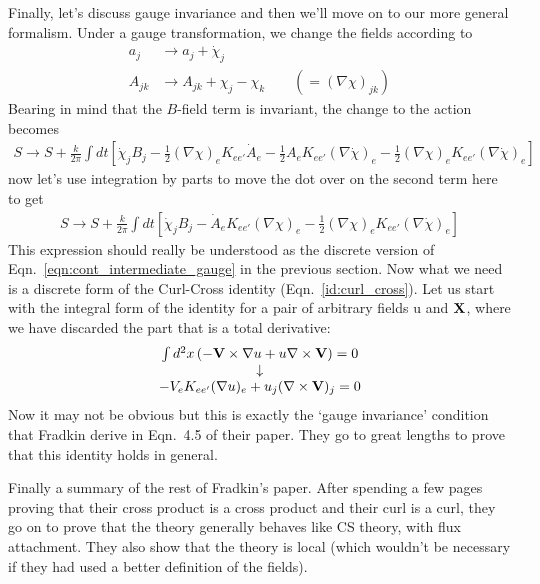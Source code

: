 \documentclass[11pt, oneside]{article} %
\numberwithin{equation}{section}
\begin{document}
Finally, let's discuss gauge invariance and then we'll move on to our more general formalism. Under a gauge transformation, we change the fields according to
\begin{align}
    a_j &\rightarrow a_j + \dot \chi_j\\
    A_{jk} &\rightarrow A_{jk} + \chi_j - \chi_k \qquad (=(\nabla \chi)_{jk})
\end{align}
Bearing in mind that the $B$-field term is invariant, the change to the action becomes
\begin{align}
    S \rightarrow S + \frac k{2\pi} \int dt
    \left [ 
        \dot \chi_j B_j 
        - \frac 12 (\nabla \chi)_e K_{ee'} \dot A_e
        - \frac 12 A_e K_{ee'} (\nabla \dot \chi)_e 
        - \frac 12 (\nabla \chi)_e K_{ee'} (\nabla \dot \chi)_e 
    \right ]
\end{align}
now let's use integration by parts to move the dot over on the second term here to get
\begin{align}
    S \rightarrow S + \frac k{2\pi} \int dt
    \left [ 
        \dot \chi_j B_j 
        -  \dot A_e K_{ee'} (\nabla \chi)_e 
        - \frac 12 (\nabla \chi)_e K_{ee'} (\nabla \dot \chi)_e 
    \right ]
\end{align}
This expression should really be understood as the discrete version of Eqn.~\ref{eqn:cont_intermediate_gauge} in the previous section. Now what we need is a discrete form of the Curl-Cross identity (Eqn.~\ref{id:curl_cross}). Let us start with the integral form of the identity for a pair of arbitrary fields u and $\textbf X$, where we have discarded the part that is a total derivative:
\begin{align}
\begin{matrix}
      \int d^2x 
      \left ( -\textbf{V} \times \nabla u   + u \nabla \times \textbf{V} \right ) = 0\\
    \downarrow \\
    - V_e K_{ee'} (\nabla u)_e + u_j (\nabla \times \textbf V)_j = 0
\end{matrix}
\end{align}
Now it may not be obvious but this is exactly the `gauge invariance' condition that Fradkin derive in Eqn.~4.5 of their paper. They go to great lengths to prove that this identity holds in general.

Finally a summary of the rest of Fradkin's paper. After spending a few pages proving that their cross product is a cross product and their curl is a curl, they go on to prove that the theory generally behaves like CS theory, with flux attachment. They also show that the theory is local (which wouldn't be necessary if they had used a better definition of the fields).
\end{document}
